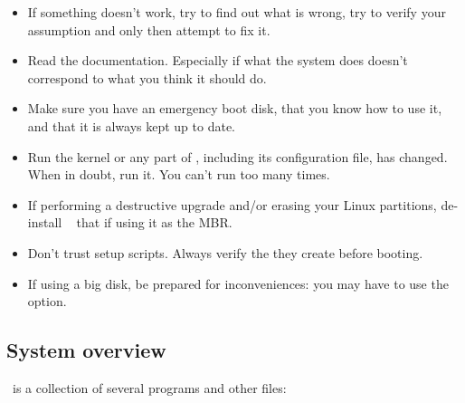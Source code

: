 \begin{itemize}
  \item {} If something doesn't work, try to find
    out what is wrong, try to verify your assumption and only then attempt
    to fix it.
  \item Read the documentation. Especially if what the system does doesn't
    correspond to what you think it should do.
  \item Make sure you have an emergency boot disk, that you know how to
    use it, and that it is always kept up to date.
  \item Run   the kernel or any part
    of \LILO, including its configuration file, has changed. When in doubt,
    run it. You can't run  too many times.
  \item If performing a destructive upgrade and/or erasing your Linux
    partitions, de-install \LILO\  that if using it as the
    MBR.
  \item Don't trust setup scripts. Always verify the 
    they create before booting.
  \item If using a big disk, be prepared for inconveniences: you may have
    to use the  option.
\end{itemize}


\newpage
\subsection*{System overview}

\LILO\ is a collection of several programs and other files:

